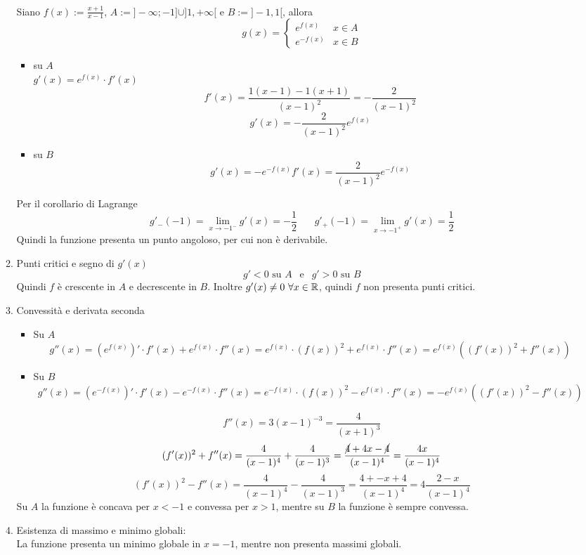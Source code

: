 \documentclass{article}
\begin{document}
\begin{enumerate}[label=\textbf{Esercizio 6.\arabic*.},itemindent=*]
\begin{enumerate}[label=\arabic*.,itemindent=*]
        \\ Siano $f(x):=\frac{x+1}{x-1}$, $A:=]-\infty;-1]\cup ]1,+\infty[$ e $B:=]-1,1[$, allora
        \[g(x)=\begin{cases}
            e^{f(x)}&x\in A\\
            e^{-f(x)}&x\in B
        \end{cases}\]
        \begin{itemize}
            \item su $A$
            \\ $g'(x)=e^{f(x)}\cdot f'(x)$\\
            \[f'(x)=\frac{1(x-1)-1(x+1)}{(x-1)^2}=-\frac{2}{(x-1)^2}\]
            \[g'(x)=-\frac{2}{(x-1)^2}e^{f(x)}\]
            \item su $B$\\
            \[g'(x)=-e^{-f(x)}f'(x)=\frac{2}{(x-1)^2}e^{-f(x)}\]
        \end{itemize}
        Per il corollario di Lagrange
        \[g'_-(-1)=\lim_{x\to-1^-}g'(x)=-\frac{1}{2}~~~~~~~~g'_+(-1)=\lim_{x\to-1^+}g'(x)=\frac{1}{2}\]
        Quindi la funzione presenta un punto angoloso, per cui non è derivabile.
        \item Punti critici e segno di $g'(x)$
        \[g'<0 \text{ su }A~~\text{ e }~~g'>0 \text{ su } B\]
        Quindi $f$ è crescente in $A$ e decrescente in $B$. Inoltre $g'(x)\neq0~\forall x \in \mathbb{R}$, quindi $f$ non presenta punti critici.
        \item Convessità e derivata seconda
        \begin{itemize}
            \item Su $A$
            \[g''(x)=(e^{f(x)})'\cdot f'(x)+e^{f(x)}\cdot f''(x)=e^{f(x)}\cdot (f(x))^2+e^{f(x)}\cdot f''(x)=e^{f(x)}((f'(x))^2+f''(x))\]
            \item Su $B$
            \[g''(x)=(e^{-f(x)})'\cdot f'(x)-e^{-f(x)}\cdot f''(x)=e^{-f(x)}\cdot (f(x))^2-e^{f(x)}\cdot f''(x)=-e^{f(x)}((f'(x))^2-f''(x))\]
        \end{itemize}
        \[f''(x)=3(x-1)^{-3}=\frac{4}{(x+1)^3}\]
        \[(f'(x))^2+f''(x)=\frac{4}{(x-1)^4}+\frac{4}{(x-1)^3}=\frac{\cancel{4}+4x-\cancel{4}}{(x-1)^4}=\frac{4x}{(x-1)^4}\]
        \[(f'(x))^2-f''(x)=\frac{4}{(x-1)^4}-\frac{4}{(x-1)^3}=\frac{4+-x+4}{(x-1)^4}=4\frac{2-x}{(x-1)^4}\]
        Su $A$ la funzione è concava per $x<-1$ e convessa per $x>1$, mentre su $B$ la funzione è sempre convessa.
        \item Esistenza di massimo e minimo globali:
        \\La funzione presenta un minimo globale in $x=-1$, mentre non presenta massimi globali.

\end{enumerate}
\end{enumerate}
\end{document}

